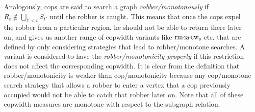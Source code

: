 Analogously, cops are said to search a graph \emph{robber\-/monotonously} if $R_t \notin \bigcup_{t'< t}S_{t'}$ until the robber is caught. This means that once the cops expel the robber from a particular region, he should not be able to return there later on, and gives us another range of copwidth variants like $\rmiacopwidth{s}$ etc. that are defined by only considering strategies that lead to robber\-/monotone searches. A variant is considered to have the \emph{robber\-/monotonicity property} if this restriction does not affect the corresponding copwidth. It is clear from the definition that robber\-/monotonicity is weaker than cop\-/monotonicity because any cop\-/monotone search strategy that allows a robber to enter a vertex that a cop previously occupied would not be able to catch that robber later on. Note that all of these copwidth measures are monotone with respect to the subgraph relation.\\
